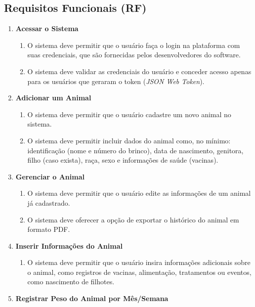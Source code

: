 \documentclass[12pt, a4paper]{article}
\begin{document}
\begin{spacing}{1.5}
\subsection{Requisitos Funcionais (RF)}
\begin{spacing}{1.5}
\begin{enumerate}[label=RF0\arabic{*}.]
    \item \textbf{Acessar o Sistema}
    \begin{enumerate}[label=RF01.0\arabic{*}]
        \item O sistema deve permitir que o usuário faça o login na plataforma com suas credenciais, que são fornecidas pelos desenvolvedores do software.
        \item O sistema deve validar as credenciais do usuário e conceder acesso apenas para os usuários que geraram o token (\textit{JSON Web Token}).
    \end{enumerate}
    \item \textbf{Adicionar um Animal}
    \begin{enumerate}[label=RF02.0\arabic{*}]
        \item O sistema deve permitir que o usuário cadastre um novo animal no sistema.
        \item O sistema deve permitir incluir dados do animal como, no mínimo: identificação (nome e número do brinco), data de nascimento, genitora, filho (caso exista), raça, sexo e informações de saúde (vacinas).
    \end{enumerate}
    \item \textbf{Gerenciar o Animal}
    \begin{enumerate}[label=RF03.0\arabic{*}]
        \item O sistema deve permitir que o usuário edite as informações de um animal já cadastrado.
        \item O sistema deve oferecer a opção de exportar o histórico do animal em formato PDF.
    \end{enumerate}
    \item \textbf{Inserir Informações do Animal}
    \begin{enumerate}[label=RF04.0\arabic{*}]
        \item O sistema deve permitir que o usuário insira informações adicionais sobre o animal, como registros de vacinas, alimentação, tratamentos ou eventos, como nascimento de filhotes.
    \end{enumerate}
    \item \textbf{Registrar Peso do Animal por Mês/Semana}

\end{enumerate}
\end{spacing}
\end{spacing}
\end{document}
